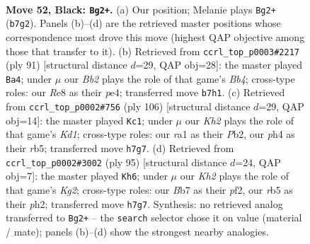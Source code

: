 \documentclass[11pt]{article}
\begin{document}
\clearpage

\begin{figure}[p]\centering
\begin{subfigure}{0.46\textwidth}\centering
\resizebox{\linewidth}{!}{%
\newchessgame
\chessboard[
  setfen={4r3/1b3p1k/6p1/1R6/7P/1P6/2Pr4/R2B1K2 b - - 0 52},
  showmover=false,
  pgfstyle=straightmove, color=movearrow, markmove={b7-g2}
]}
\caption{}
\end{subfigure}\hfill
\begin{subfigure}{0.46\textwidth}\centering
\resizebox{\linewidth}{!}{%
\newchessgame
\chessboard[
  setfen={8/6k1/7p/1b1R2p1/4P3/4K1P1/2rB3P/8 b - - 3 46},
  showmover=false,
  pgfstyle=straightmove, color=movearrow, markmove={b5-a4}
]}
\caption{}
\end{subfigure}
\\[4pt]
\begin{subfigure}{0.46\textwidth}\centering
\resizebox{\linewidth}{!}{%
\newchessgame
\chessboard[
  setfen={6k1/1p3b1p/7B/1r4p1/6P1/5R1P/1P6/3K4 w - - 6 54},
  showmover=false,
  pgfstyle=straightmove, color=movearrow, markmove={d1-c1}
]}
\caption{}
\end{subfigure}\hfill
\begin{subfigure}{0.46\textwidth}\centering
\resizebox{\linewidth}{!}{%
\newchessgame
\chessboard[
  setfen={1r6/2R3k1/6p1/1P5p/2B1K3/6P1/1r3P1P/8 b - - 4 48},
  showmover=false,
  pgfstyle=straightmove, color=movearrow, markmove={g7-h6}
]}
\caption{}
\end{subfigure}
\caption{\textbf{Move 52, Black: \texttt{Bg2+}.} (a) Our position; Melanie plays \texttt{Bg2+} (\texttt{b7g2}). Panels (b)--(d) are the retrieved master positions whose correspondence most drove this move (highest QAP objective among those that transfer to it). (b) Retrieved from \texttt{ccrl\_top\_p0003\#2217} (ply 91) [structural distance $d$=29, QAP obj=28]: the master played \texttt{Ba4}; under $\mu$ our \emph{Bb2} plays the role of that game's \emph{Bb4}; cross-type roles: our \emph{R}e8 as their \emph{p}e4; transferred move \texttt{b7h1}. (c) Retrieved from \texttt{ccrl\_top\_p0002\#756} (ply 106) [structural distance $d$=29, QAP obj=14]: the master played \texttt{Kc1}; under $\mu$ our \emph{Kh2} plays the role of that game's \emph{Kd1}; cross-type roles: our \emph{r}a1 as their \emph{P}b2, our \emph{p}h4 as their \emph{r}b5; transferred move \texttt{h7g7}. (d) Retrieved from \texttt{ccrl\_top\_p0002\#3002} (ply 95) [structural distance $d$=24, QAP obj=7]: the master played \texttt{Kh6}; under $\mu$ our \emph{Kh2} plays the role of that game's \emph{Kg2}; cross-type roles: our \emph{B}b7 as their \emph{p}f2, our \emph{r}b5 as their \emph{p}h2; transferred move \texttt{h7g7}. Synthesis: no retrieved analog transferred to \texttt{Bg2+} -- the \texttt{search} selector chose it on value (material / mate); panels (b)--(d) show the strongest nearby analogies.}
\label{fig:thought-m103}
\end{figure}
\end{document}
